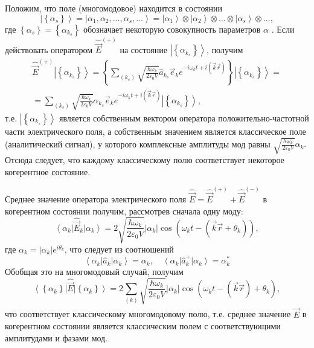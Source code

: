 Положим, что поле (многомодовое) находится в состоянии
\[
\left| \left\{\alpha_s\right\}\right> = 
\left| \alpha_1, \alpha_2, \dots, \alpha_s, \dots\right> = 
\left| \alpha_1\right>
\otimes
\left| \alpha_2\right>
\otimes
\dots
\otimes
\left| \alpha_s\right>
\otimes
\dots,
\]
где $\left\{\alpha_s\right\}= \left\{\alpha_{k_s}\right\}$
обозначает некоторую совокупность параметров $\alpha$ . Если действовать
оператором $\hat{\vec{E}}^{(+)}$ на состояние  $\left|\left\{\alpha_{k_s}\right\}\right>$,  получим 
\begin{eqnarray}
\hat{\vec{E}}^{(+)}\left|\left\{\alpha_{k_s}\right\}\right> = 
\left\{ \sum_{(k_s)} \sqrt{\frac{\hbar \omega_k}{2 \varepsilon_0
V}} \hat{a}_{k_s} \vec{e}_k e^{-i \omega_k t + i \left(\vec{k}\vec{r}
  \right)}\right\}\left|\left\{\alpha_{k_s}\right\}\right> = 
\nonumber \\
= 
\sum_{(k_s)} \sqrt{\frac{\hbar \omega_k}{2 \varepsilon_0
V}} \alpha_{k_s} \vec{e}_k e^{-i \omega_k t + i \left(\vec{k}\vec{r}
  \right)}\left|\left\{\alpha_{k_s}\right\}\right>,
\end{eqnarray}
т.е. $\left|\left\{\alpha_{k_s}\right\}\right>$  является собственным
вектором оператора положительно-частотной части электрического поля, а
собственным значением является классическое поле (аналитический
сигнал), у которого комплексные амплитуды мод равны  
\(
\sqrt{\frac{\hbar \omega_k}{2 \varepsilon_0
V}} \alpha_k.
\)
Отсюда следует, что каждому классическому полю соответствует некоторое
когерентное состояние. 

Среднее значение оператора электрического поля $\hat{\vec{E}} =
\hat{\vec{E}}^{(+)} + \hat{\vec{E}}^{(-)}$   в когерентном
состоянии получим, рассмотрев сначала одну моду: 
\[
\left<\alpha_{k}\right|\hat{\vec{E}}_k\left|\alpha_{k}\right> = 2
\sqrt{\frac{\hbar \omega_k}{2 \varepsilon_0
V}}\left|\alpha_{k}\right|\cos 
\left(\omega_k t - \left(\vec{k} \vec{r} + \theta_k\right) \right),
\]
где $\alpha_k = \left|\alpha_{k}\right| e^{i \theta_k}$, что следует из соотношений
\[
\left<\alpha_k\right|\hat{a}_k\left|\alpha_k\right> = \alpha_k, \quad
\left<\alpha_k\right|\hat{a}^{+}_k\left|\alpha_k\right> = \alpha^{*}_k
\]
Обобщая это на многомодовый случай, получим
\begin{equation}
\left<\left\{\alpha_{k}\right\}\right|\hat{\vec{E}}\left|\left\{\alpha_{k}\right\}\right>
= 2 \sum_{(k)} \sqrt{\frac{\hbar \omega_k}{2 \varepsilon_0
V}} \left|\alpha_k\right|\cos \left(\omega_k t -
\left(\vec{k}\vec{r}\right) + \theta_k \right),
\end{equation}
что соответствует классическому многомодовому полю, т.е. среднее
значение $\hat{\vec{E}}$   в когерентном состоянии является
классическим полем с соответствующими амплитудами и фазами мод. 

